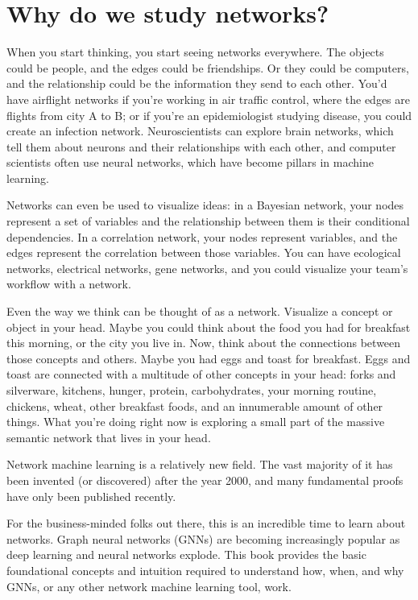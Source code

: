 \section{Why do we study networks?}
\label{sec:ch1:howstudy}

When you start thinking, you start seeing networks everywhere. The objects could be people, and the edges could be friendships. Or they could be computers, and the relationship could be the information they send to each other. You'd have airflight networks if you're working in air traffic control, where the edges are flights from city A to B; or if you're an epidemiologist studying disease, you could create an infection network. Neuroscientists can explore brain networks, which tell them about neurons and their relationships with each other, and computer scientists often use neural networks, which have become pillars in machine learning.

Networks can even be used to visualize ideas: in a Bayesian network, your nodes represent a set of variables and the relationship between them is their conditional dependencies. In a correlation network, your nodes represent variables, and the edges represent the correlation between those variables. You can have ecological networks, electrical networks, gene networks, and you could visualize your team's workflow with a network.

Even the way we think can be thought of as a network. Visualize a concept or object in your head. Maybe you could think about the food you had for breakfast this morning, or the city you live in. Now, think about the connections between those concepts and others. Maybe you had eggs and toast for breakfast. Eggs and toast are connected with a multitude of other concepts in your head: forks and silverware, kitchens, hunger, protein, carbohydrates, your morning routine, chickens, wheat, other breakfast foods, and an innumerable amount of other things. What you're doing right now is exploring a small part of the massive semantic network that lives in your head.

Network machine learning is a relatively new field. The vast majority of it has been invented (or discovered) after the year 2000, and many fundamental proofs have only been published recently. 

For the business-minded folks out there, this is an incredible time to learn about networks. Graph neural networks (GNNs) are becoming increasingly popular as deep learning and neural networks explode. This book provides the basic foundational concepts and intuition required to understand how, when, and why GNNs, or any other network machine learning tool, work.


